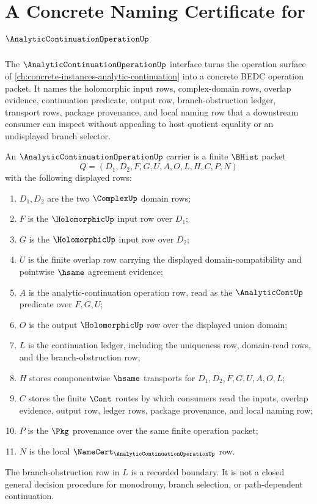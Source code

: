 \chapter{A Concrete Naming Certificate for $\AnalyticContinuationOperationUp$}
\label{ch:concrete-instances-analyticcontinuationoperation-namecert}

The $\AnalyticContinuationOperationUp$ interface turns the operation surface of \autoref{ch:concrete-instances-analytic-continuation} into a concrete BEDC operation packet. It names the holomorphic input rows, complex-domain rows, overlap evidence, continuation predicate, output row, branch-obstruction ledger, transport rows, package provenance, and local naming row that a downstream consumer can inspect without appealing to host quotient equality or an undisplayed branch selector.

\begin{definition}
\label{def:analytic-continuation-operation-carrier}
An $\AnalyticContinuationOperationUp$ carrier is a finite $\BHist$ packet
$$
Q=(D_1,D_2,F,G,U,A,O,L,H,C,P,N)
$$
with the following displayed rows:
\begin{enumerate}
\item $D_1,D_2$ are the two $\ComplexUp$ domain rows;
\item $F$ is the $\HolomorphicUp$ input row over $D_1$;
\item $G$ is the $\HolomorphicUp$ input row over $D_2$;
\item $U$ is the finite overlap row carrying the displayed domain-compatibility and pointwise $\hsame$ agreement evidence;
\item $A$ is the analytic-continuation operation row, read as the $\AnalyticContUp$ predicate over $F,G,U$;
\item $O$ is the output $\HolomorphicUp$ row over the displayed union domain;
\item $L$ is the continuation ledger, including the uniqueness row, domain-read rows, and the branch-obstruction row;
\item $H$ stores componentwise $\hsame$ transports for $D_1,D_2,F,G,U,A,O,L$;
\item $C$ stores the finite $\Cont$ routes by which consumers read the inputs, overlap evidence, output row, ledger rows, package provenance, and local naming row;
\item $P$ is the $\Pkg$ provenance over the same finite operation packet;
\item $N$ is the local $\NameCert_{\AnalyticContinuationOperationUp}$ row.
\end{enumerate}
The branch-obstruction row in $L$ is a recorded boundary. It is not a closed general decision procedure for monodromy, branch selection, or path-dependent continuation.
\end{definition}

